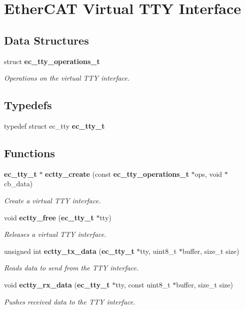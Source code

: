\section{Ether\-C\-A\-T Virtual T\-T\-Y Interface}
\label{group__TTYInterface}
\subsection*{Data Structures}
\begin{DoxyCompactItemize}
\item 
struct {\bf ec\-\_\-tty\-\_\-operations\-\_\-t}
\begin{DoxyCompactList}\small\item\em Operations on the virtual T\-T\-Y interface. \end{DoxyCompactList}\end{DoxyCompactItemize}
\subsection*{Typedefs}
\begin{DoxyCompactItemize}
\item 
typedef struct ec\-\_\-tty {\bf ec\-\_\-tty\-\_\-t}
\end{DoxyCompactItemize}
\subsection*{Functions}
\begin{DoxyCompactItemize}
\item 
{\bf ec\-\_\-tty\-\_\-t} $\ast$ {\bf ectty\-\_\-create} (const {\bf ec\-\_\-tty\-\_\-operations\-\_\-t} $\ast$ops, void $\ast$cb\-\_\-data)
\begin{DoxyCompactList}\small\item\em Create a virtual T\-T\-Y interface. \end{DoxyCompactList}\item 
void {\bf ectty\-\_\-free} ({\bf ec\-\_\-tty\-\_\-t} $\ast$tty)
\begin{DoxyCompactList}\small\item\em Releases a virtual T\-T\-Y interface. \end{DoxyCompactList}\item 
unsigned int {\bf ectty\-\_\-tx\-\_\-data} ({\bf ec\-\_\-tty\-\_\-t} $\ast$tty, uint8\-\_\-t $\ast$buffer, size\-\_\-t size)
\begin{DoxyCompactList}\small\item\em Reads data to send from the T\-T\-Y interface. \end{DoxyCompactList}\item 
void {\bf ectty\-\_\-rx\-\_\-data} ({\bf ec\-\_\-tty\-\_\-t} $\ast$tty, const uint8\-\_\-t $\ast$buffer, size\-\_\-t size)
\begin{DoxyCompactList}\small\item\em Pushes received data to the T\-T\-Y interface. \end{DoxyCompactList}\end{DoxyCompactItemize}


